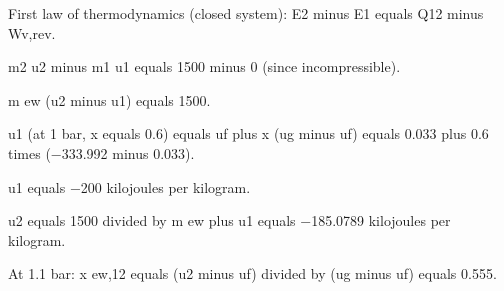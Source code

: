 First law of thermodynamics (closed system):  
E2 minus E1 equals Q12 minus Wv,rev.  

m2 u2 minus m1 u1 equals 1500 minus 0 (since incompressible).  

m ew (u2 minus u1) equals 1500.  

u1 (at 1 bar, x equals 0.6) equals uf plus x (ug minus uf) equals 0.033 plus 0.6 times (−333.992 minus 0.033).  

u1 equals −200 kilojoules per kilogram.  

u2 equals 1500 divided by m ew plus u1 equals −185.0789 kilojoules per kilogram.  

At 1.1 bar:  
x ew,12 equals (u2 minus uf) divided by (ug minus uf) equals 0.555.